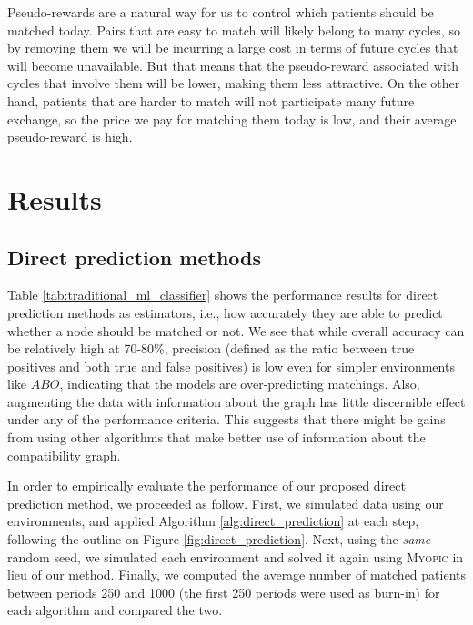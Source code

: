 \documentclass[format=acmsmall, review=false]{acmart}
\begin{document}
Pseudo-rewards are a natural way for us to control which patients should be matched today. Pairs that are easy to match will likely belong to many cycles, so by removing them we will be incurring a large cost in terms of future cycles that will become unavailable. But that means that the pseudo-reward associated with cycles that involve them will be lower, making them less attractive. On the other hand, patients that are harder to match will not participate many future exchange, so the price we pay for matching them today is low, and their average pseudo-reward is high. 




\section{Results}

\subsection{Direct prediction methods} 

Table \ref{tab:traditional_ml_classifier} shows the performance results for direct prediction methods as estimators, i.e., how accurately they are able to predict whether a node should be matched or not. We see that while overall accuracy can be relatively high at 70-80\%, precision (defined as the ratio between true positives and both true and false positives) is low even for simpler environments like $ABO$, indicating that the models are over-predicting matchings. Also, augmenting the data with information about the graph has little discernible effect under any of the performance criteria. This suggests that there might be gains from using other algorithms that make better use of information about the compatibility graph. 

In order to empirically evaluate the performance of our proposed direct prediction method, we proceeded as follow. First, we simulated data using our environments, and applied Algorithm \ref{alg:direct_prediction} at each step, following the outline on Figure \ref{fig:direct_prediction}. Next, using the \emph{same} random seed, we simulated each environment and solved it again using \textsc{Myopic} in lieu of our method. Finally, we computed the average number of matched patients between periods 250 and 1000 (the first 250 periods were used as burn-in) for each algorithm and compared the two. 
\end{document}
